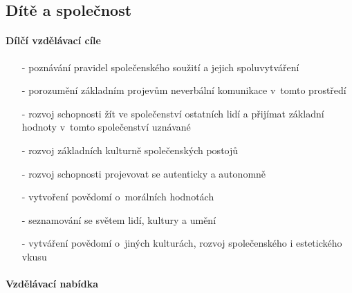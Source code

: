 			\subsection{Dítě a společnost}
				\textit{} \citep[s.~26]{RVP}

					\paragraph{Dílčí vzdělávací cíle}

					\begin{itemize}
					\setlength\itemsep{-2mm}
						\item[-]poznávání pravidel společenského soužití a jejich spoluvytváření
						\item[-]porozumění základním projevům neverbální komunikace v~tomto prostředí
						\item[-]rozvoj schopnosti žít ve společenství ostatních lidí a přijímat základní hodnoty v~tomto společenství uznávané
						\item[-]rozvoj základních kulturně společenských postojů
						\item[-]rozvoj schopnosti projevovat se autenticky a autonomně
						\item[-]vytvoření povědomí o~morálních hodnotách
						\item[-]seznamování se světem lidí, kultury a umění
						\item[-]vytváření povědomí o~jiných kulturách, rozvoj společenského i estetického vkusu
					\end{itemize}

					\paragraph{Vzdělávací nabídka}

